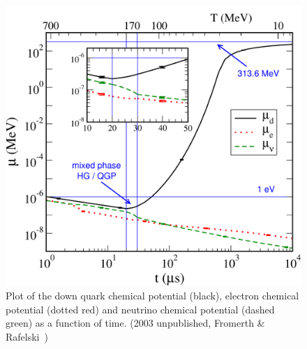 \documentclass[universe,article,submit,moreauthors,pdftex,a4paper]{Definitions/mdpi}
\begin{document}
\begin{figure}[ht]
 \centering
 \includegraphics[width=\textwidth]{./plots/mu_combo.pdf}
 \caption{Plot of the down quark chemical potential (black), electron chemical potential (dotted red) and neutrino chemical potential (dashed green) as a function of time. (2003 unpublished, Fromerth \& Rafelski~\cite{Rafelski:2019twp})}
 \label{QGPchem1} 
\end{figure}
\end{document}
